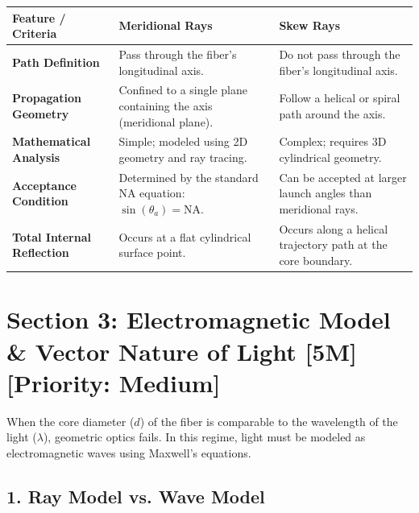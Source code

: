 \begin{table}[H]
\centering
\begin{tabular}{|p{}|p{}|p{}|}
\hline
Feature / Criteria & Meridional Rays & Skew Rays \\
\hline
\textbf{Path Definition} & Pass through the fiber's longitudinal axis. & Do not pass through the fiber's longitudinal axis. \\
\hline
\textbf{Propagation Geometry} & Confined to a single plane containing the axis (meridional plane). & Follow a helical or spiral path around the axis. \\
\hline
\textbf{Mathematical Analysis} & Simple; modeled using 2D geometry and ray tracing. & Complex; requires 3D cylindrical geometry. \\
\hline
\textbf{Acceptance Condition} & Determined by the standard NA equation: $\sin(\theta_a) = \text{NA}$. & Can be accepted at larger launch angles than meridional rays. \\
\hline
\textbf{Total Internal Reflection} & Occurs at a flat cylindrical surface point. & Occurs along a helical trajectory path at the core boundary. \\
\hline
\end{tabular}
\end{table}


\section{Section 3: Electromagnetic Model \& Vector Nature of Light [5M] [Priority: Medium]}

When the core diameter ($d$) of the fiber is comparable to the wavelength of the light ($\lambda$), geometric optics fails. In this regime, light must be modeled as electromagnetic waves using Maxwell's equations.

\subsection{1. Ray Model vs. Wave Model}

